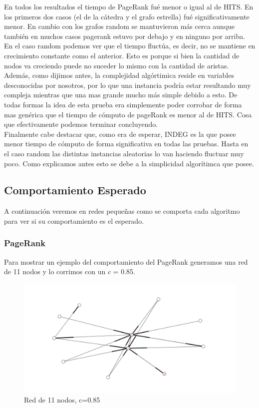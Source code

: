 En todos los resultados el tiempo de PageRank fué menor o igual al de HITS. En los primeros dos casos (el de la cátedra y el grafo estrella) fué significativamente menor. En cambio con los grafos random se mantuvieron más cerca aunque también en muchos casos pagerank estuvo por debajo y en ninguno por arriba.\\
En el caso random podemos ver que el tiempo fluctúa, es decir, no se mantiene en crecimiento constante como el anterior. Esto es porque si bien la cantidad de nodos va creciendo puede no suceder lo mismo con la cantidad de aristas. Además, como dijimos antes, la complejidad algórtimica reside en variables desconocidas por nosotros, por lo que una instancia podría estar resultando muy compleja mientras que una mas grande mucho más simple debido a esto. De todas formas la idea de esta prueba era simplemente poder corrobar de forma mas genérica que el tiempo de cómputo de pageRank es menor al de HITS. Cosa que efectivamente podemos terminar concluyendo.\\
Finalmente cabe destacar que, como era de esperar, INDEG es la que posee menor tiempo de cómputo de forma significativa en todas las pruebas. Hasta en el caso random las distintas instancias aleatorias lo van haciendo fluctuar muy poco. Como explicamos antes esto se debe a la simplicidad algorítimca que posee.

\subsection{Comportamiento Esperado}

A continuación veremos en redes pequeñas como se comporta cada algoritmo para ver si su comportamiento es el esperado.

\subsubsection{PageRank}
Para mostrar un ejemplo del comportamiento del PageRank generamos una red de 11 nodos y lo corrimos con un $c$ = 0.85.

 \begin{figure}[!htb]
\begin{center}
    \includegraphics[scale=0.5]{imagenes/test5.png}
    \caption{Red de 11 nodos, c=0.85}
    \end{center}
\end{figure}

